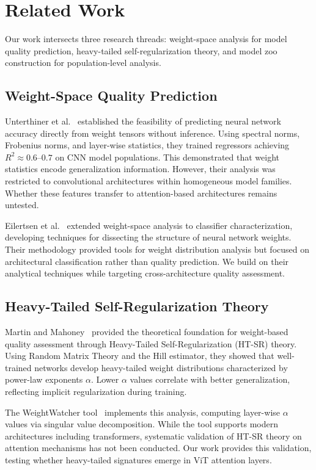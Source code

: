 \section{Related Work}
\label{sec:related}

Our work intersects three research threads: weight-space analysis for model quality prediction, heavy-tailed self-regularization theory, and model zoo construction for population-level analysis.

\subsection{Weight-Space Quality Prediction}

Unterthiner et al.~\cite{unterthiner2020predicting} established the feasibility of predicting neural network accuracy directly from weight tensors without inference. Using spectral norms, Frobenius norms, and layer-wise statistics, they trained regressors achieving $R^2 \approx 0.6$--$0.7$ on CNN model populations. This demonstrated that weight statistics encode generalization information. However, their analysis was restricted to convolutional architectures within homogeneous model families. Whether these features transfer to attention-based architectures remains untested.

Eilertsen et al.~\cite{eilertsen2020classifying} extended weight-space analysis to classifier characterization, developing techniques for dissecting the structure of neural network weights. Their methodology provided tools for weight distribution analysis but focused on architectural classification rather than quality prediction. We build on their analytical techniques while targeting cross-architecture quality assessment.

\subsection{Heavy-Tailed Self-Regularization Theory}

Martin and Mahoney~\cite{martin2021implicit} provided the theoretical foundation for weight-based quality assessment through Heavy-Tailed Self-Regularization (HT-SR) theory. Using Random Matrix Theory and the Hill estimator, they showed that well-trained networks develop heavy-tailed weight distributions characterized by power-law exponents $\alpha$. Lower $\alpha$ values correlate with better generalization, reflecting implicit regularization during training.

The WeightWatcher tool~\cite{martin2020weightwatcher} implements this analysis, computing layer-wise $\alpha$ values via singular value decomposition. While the tool supports modern architectures including transformers, systematic validation of HT-SR theory on attention mechanisms has not been conducted. Our work provides this validation, testing whether heavy-tailed signatures emerge in ViT attention layers.

